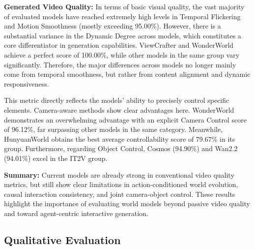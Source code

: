 \textbf{Generated Video Quality:} In terms of basic visual quality, the vast majority of evaluated models have reached extremely high levels in Temporal Flickering and Motion Smoothness (mostly exceeding 95.00\%). However, there is a substantial variance in the Dynamic Degree across models, which constitutes a core differentiator in generation capabilities. ViewCrafter and WonderWorld achieve a perfect score of 100.00\%, while other models in the same group vary significantly. Therefore, the major differences across models no longer mainly come from temporal smoothness, but rather from content alignment and dynamic responsiveness.

This metric directly reflects the models' ability to precisely control specific elements. Camera-aware methods show clear advantages here. WonderWorld demonstrates an overwhelming advantage with an explicit Camera Control score of 96.12\%, far surpassing other models in the same category. Meanwhile, HunyuanWorld obtains the best average controllability score of 79.67\% in its group. Furthermore, regarding Object Control, Cosmos (94.90\%) and Wan2.2 (94.01\%) excel in the IT2V group.

\textbf{Summary:} Current models are already strong in conventional video quality metrics, but still show clear limitations in action-conditioned world evolution, causal interaction consistency, and joint camera-object control. These results highlight the importance of evaluating world models beyond passive video quality and toward agent-centric interactive generation.






\subsection{Qualitative Evaluation}

